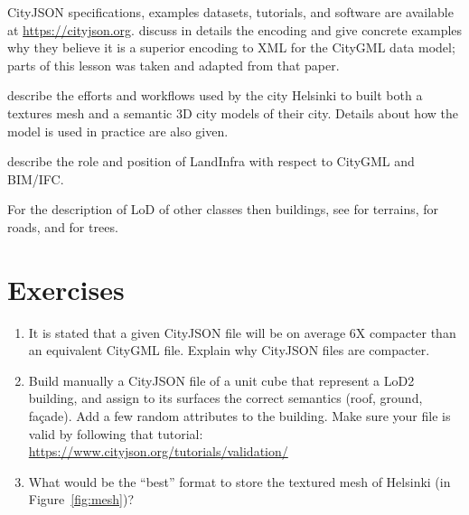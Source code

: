 CityJSON specifications, examples datasets, tutorials, and software are available at \url{https://cityjson.org}.
\citet{Ledoux19} discuss in details the encoding and give concrete examples why they believe it is a superior encoding to XML for the CityGML data model; parts of this lesson was taken and adapted from that paper.

\citet{Helsinki19} describe the efforts and workflows used by the city Helsinki to built both a textures mesh and a semantic 3D city models of their city. 
Details about how the model is used in practice are also given.

\citet{Kumar19} describe the role and position of LandInfra with respect to CityGML and BIM/IFC\@.

For the description of LoD of other classes then buildings, see \citet{Kumar19} for terrains, \citet{Labetski18} for roads, and \citet{Ortega18} for trees.

%
\section{Exercises}

\begin{enumerate}
  \item It is stated that a given CityJSON file will be on average 6X compacter than an equivalent CityGML file. Explain why CityJSON files are compacter.
  \item Build manually a CityJSON file of a unit cube that represent a LoD2 building, and assign to its surfaces the correct semantics (roof, ground, façade). Add a few random attributes to the building. Make sure your file is valid by following that tutorial: \url{https://www.cityjson.org/tutorials/validation/}
  \item What would be the ``best'' format to store the textured mesh of Helsinki (in Figure~\ref{fig:mesh})?
\end{enumerate}
